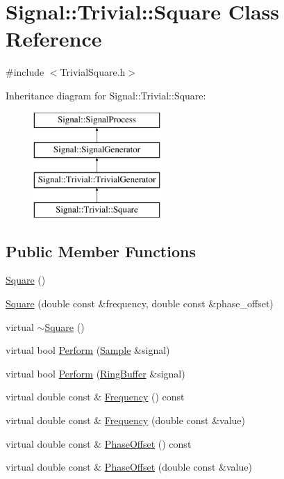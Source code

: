 \hypertarget{classSignal_1_1Trivial_1_1Square}{\section{Signal\+:\+:Trivial\+:\+:Square Class Reference}
\label{classSignal_1_1Trivial_1_1Square}
}


{\ttfamily \#include $<$Trivial\+Square.\+h$>$}

Inheritance diagram for Signal\+:\+:Trivial\+:\+:Square\+:\begin{figure}[H]
\begin{center}
\leavevmode
\includegraphics[height=4.000000cm]{classSignal_1_1Trivial_1_1Square}
\end{center}
\end{figure}
\subsection*{Public Member Functions}
\begin{DoxyCompactItemize}
\item 
\hyperlink{classSignal_1_1Trivial_1_1Square_abc150f0d5260b900666b09684904ceea}{Square} ()
\item 
\hyperlink{classSignal_1_1Trivial_1_1Square_ac9e5b726780423e47cb533ab7cba7d7d}{Square} (double const \&frequency, double const \&phase\+\_\+offset)
\item 
virtual \hyperlink{classSignal_1_1Trivial_1_1Square_a96dcc9426f1119f1323f0ad595c02be2}{$\sim$\+Square} ()
\item 
virtual bool \hyperlink{classSignal_1_1Trivial_1_1Square_a44de325e3b9c986e2ae2ca52b6ba40cf}{Perform} (\hyperlink{classSignal_1_1Sample}{Sample} \&signal)
\item 
virtual bool \hyperlink{classSignal_1_1Trivial_1_1Square_a5743c7134f32bf283da27be62c2d32ab}{Perform} (\hyperlink{classSignal_1_1RingBuffer}{Ring\+Buffer} \&signal)
\item 
virtual double const \& \hyperlink{classSignal_1_1SignalGenerator_a96af42ee68f94e9b04d034fd68b73ecd}{Frequency} () const 
\item 
virtual double const \& \hyperlink{classSignal_1_1SignalGenerator_af83b532bf3ddc3637c2fd7a1dfd095cb}{Frequency} (double const \&value)
\item 
virtual double const \& \hyperlink{classSignal_1_1SignalGenerator_ac2538ec946f001e394d2416fda698d1c}{Phase\+Offset} () const 
\item 
virtual double const \& \hyperlink{classSignal_1_1SignalGenerator_ac6a103ff72beaa338f6d18c812522d78}{Phase\+Offset} (double const \&value)
\end{DoxyCompactItemize}
